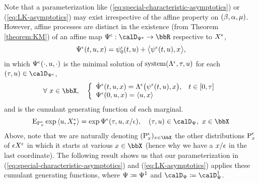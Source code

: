 Note that a parameterization like (\ref{eq:special-characteristic-asymptotics}) or (\ref{eq:LK-asymptotics}) may exist irrespective of the affine property on $(\beta, \alpha, \mu)$.
However, affine processes are distinct in the existence (from Theorem \ref{theorem:KM}) of an affine map $\aff^\epsilon: \momentSpacee \rightarrow \bbR$ respective to $X^\epsilon$,
\begin{equation*}
  \Psi^\epsilon(t, u, x) = \psi^\epsilon_0(t,u) + {\big\langle \psi^\epsilon(t,u) , x \big\rangle},
\end{equation*}
in which $\Psi^\epsilon(\cdot, u, \cdot)$ is the minimal solution of $\operatorname{system}(\Lambda^\epsilon, \tau, u)$ for each $(\tau, \momentVar) \in \momentSpacee$,
\begin{equation*}
  \forall~ \stateVar \in \stateSpace, \quad \left\{\begin{array}{ll}
    \displaystyle \dot\aff^\epsilon(t, \momentVar, \stateVar) = \ode^\epsilon\big( \affPart^\epsilon(t, \momentVar), \stateVar \big), & t \in [0,\tau] \\
    \aff^\epsilon(0, \momentVar, \stateVar) = \prj{\momentVar}{\stateVar}
  \end{array}\right.
\end{equation*}
and is the cumulant generating function of each marginal.
\begin{equation*}
  \Exp_{\Prb^\epsilon_\stateVar} \exp\prj{\momentVar}{\Xee_\tau} = \exp\aff^\epsilon(\tau, \momentVar, \stateVar/\epsilon), \quad (\tau, \momentVar) \in \momentSpace, ~ \stateVar \in \stateSpace
\end{equation*}
Above, note that we are naturally denoting $(\Prb^\epsilon_\stateVar)_{\stateVar\in\stateSpace}$ the other distributions ${\operatorname{P}}^\epsilon_x$ of $\epsilon X^\epsilon$ in which it starts at various $\stateVar \in \stateSpace$ (hence why we have a $x/\epsilon$ in the last coordinate).
The following result shows us that our parameterization in (\ref{eq:special-characteristic-asymptotics}) and (\ref{eq:LK-asymptotics}) applies these cumulant generating functions, where $\Psi \coloneqq \Psi^1$ and $\momentSpace \defeq \momentSpace^1$.



